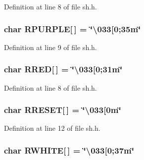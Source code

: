 Definition at line 8 of file sh.\+h.

\subsubsection[{\texorpdfstring{R\+P\+U\+R\+P\+LE}{RPURPLE}}]{\setlength{\rightskip}{0pt plus 5cm}char R\+P\+U\+R\+P\+LE\mbox{[}$\,$\mbox{]} = \char`\"{}\textbackslash{}033\mbox{[}0;35m\char`\"{}}\hypertarget{namespace_k_a16f016905667739f3d64b6ab7e4d7f95}{}\label{namespace_k_a16f016905667739f3d64b6ab7e4d7f95}


Definition at line 9 of file sh.\+h.

\subsubsection[{\texorpdfstring{R\+R\+ED}{RRED}}]{\setlength{\rightskip}{0pt plus 5cm}char R\+R\+ED\mbox{[}$\,$\mbox{]} = \char`\"{}\textbackslash{}033\mbox{[}0;31m\char`\"{}}\hypertarget{namespace_k_ae976a2e4e900318926db4fa1624bc30a}{}\label{namespace_k_ae976a2e4e900318926db4fa1624bc30a}


Definition at line 8 of file sh.\+h.

\subsubsection[{\texorpdfstring{R\+R\+E\+S\+ET}{RRESET}}]{\setlength{\rightskip}{0pt plus 5cm}char R\+R\+E\+S\+ET\mbox{[}$\,$\mbox{]} = \char`\"{}\textbackslash{}033\mbox{[}0m\char`\"{}}\hypertarget{namespace_k_a610d2184e75b6475eaf1f16700be824e}{}\label{namespace_k_a610d2184e75b6475eaf1f16700be824e}


Definition at line 12 of file sh.\+h.

\subsubsection[{\texorpdfstring{R\+W\+H\+I\+TE}{RWHITE}}]{\setlength{\rightskip}{0pt plus 5cm}char R\+W\+H\+I\+TE\mbox{[}$\,$\mbox{]} = \char`\"{}\textbackslash{}033\mbox{[}0;37m\char`\"{}}\hypertarget{namespace_k_a37a06065638319240adf83b5bdfdf313}{}\label{namespace_k_a37a06065638319240adf83b5bdfdf313}


